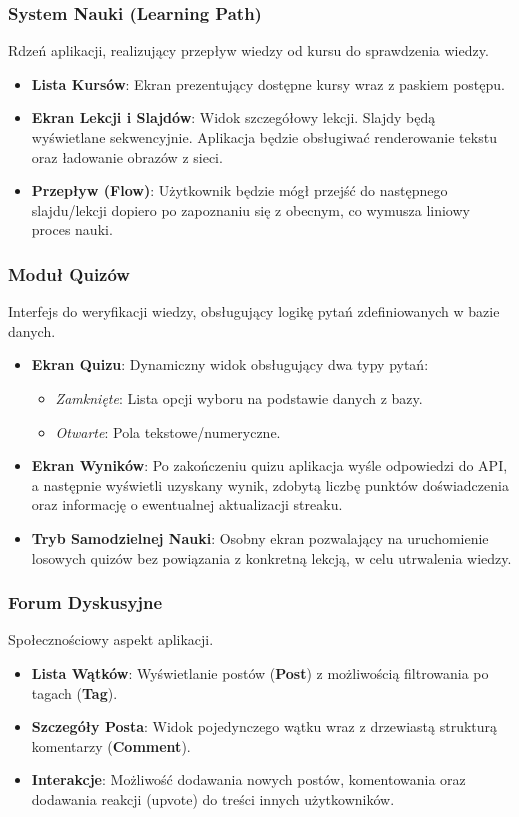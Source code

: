 \documentclass[11pt,a4paper]{article}
\numberwithin{equation}{section}
\begin{document}
\subsubsection{System Nauki (Learning Path)}
Rdzeń aplikacji, realizujący przepływ wiedzy od kursu do sprawdzenia wiedzy.
\begin{itemize}
    \item \textbf{Lista Kursów}: Ekran prezentujący dostępne kursy  wraz z paskiem postępu.
    \item \textbf{Ekran Lekcji i Slajdów}: Widok szczegółowy lekcji. Slajdy będą wyświetlane sekwencyjnie. Aplikacja będzie obsługiwać renderowanie tekstu oraz ładowanie obrazów z sieci.
    \item \textbf{Przepływ (Flow)}: Użytkownik będzie mógł przejść do następnego slajdu/lekcji dopiero po zapoznaniu się z obecnym, co wymusza liniowy proces nauki.
\end{itemize}

\subsubsection{Moduł Quizów}
Interfejs do weryfikacji wiedzy, obsługujący logikę pytań zdefiniowanych w bazie danych.
\begin{itemize}
    \item \textbf{Ekran Quizu}: Dynamiczny widok obsługujący dwa typy pytań:
        \begin{itemize}
            \item \textit{Zamknięte}: Lista opcji wyboru na podstawie danych z bazy.
            \item \textit{Otwarte}: Pola tekstowe/numeryczne.
        \end{itemize}
    \item \textbf{Ekran Wyników}: Po zakończeniu quizu aplikacja wyśle odpowiedzi do API, a następnie wyświetli uzyskany wynik, zdobytą liczbę punktów doświadczenia oraz informację o ewentualnej aktualizacji streaku.
    \item \textbf{Tryb Samodzielnej Nauki}: Osobny ekran pozwalający na uruchomienie losowych quizów bez powiązania z konkretną lekcją, w celu utrwalenia wiedzy.
\end{itemize}

\subsubsection{Forum Dyskusyjne}
Społecznościowy aspekt aplikacji.
\begin{itemize}
    \item \textbf{Lista Wątków}: Wyświetlanie postów (\textbf{Post}) z możliwością filtrowania po tagach (\textbf{Tag}).
    \item \textbf{Szczegóły Posta}: Widok pojedynczego wątku wraz z drzewiastą strukturą komentarzy (\textbf{Comment}).
    \item \textbf{Interakcje}: Możliwość dodawania nowych postów, komentowania oraz dodawania reakcji (upvote) do treści innych użytkowników.
\end{itemize}
\end{document}
